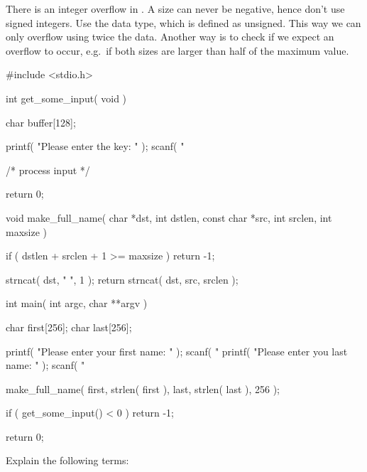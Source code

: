\documentclass[svv,addpoints]{miunexam}
\begin{document}
\begin{questions}
\begin{solution}
    There is an integer overflow in .
    A size can never be negative, hence don't use signed integers.
    Use the  data type, which is defined as unsigned.
    This way we can only overflow using twice the data.
    Another way is to check if we expect an overflow to occur, e.g.~if both 
    sizes are larger than half of the maximum value.
  \end{solution}

  \begin{src}[float,caption={Some vulnerable C code.},label={lst:overrun}]
#include <stdio.h>

int
get_some_input( void )
{
  char buffer[128];

  printf( "Please enter the key: " );
  scanf( "%

  /* process input */

  return 0;
}

void
make_full_name( char *dst, int dstlen,
                const char *src, int srclen,
                int maxsize )
{
  if ( dstlen + srclen + 1 >= maxsize )
    return -1;

  strncat( dst, " ", 1 );
  return strncat( dst, src, srclen );
}

int
main( int argc, char **argv )
{
  char first[256];
  char last[256];

  printf( "Please enter your first name: " );
  scanf( "%
  printf( "Please enter you last name: " );
  scanf( "%

  make_full_name( first, strlen( first ),
                  last, strlen( last ), 256 );

  if ( get_some_input() < 0 )
    return -1;

  return 0;
}
  \end{src}


\question\label{q:passwd:auth:E}
  Explain the following terms:
\end{questions}
\end{document}
